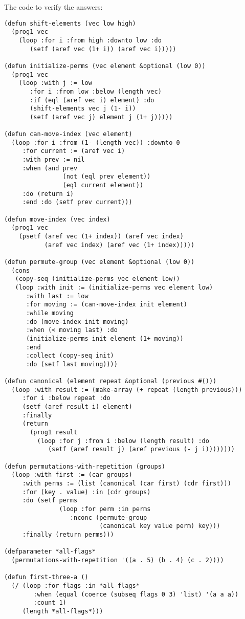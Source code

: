 \documentclass[11pt]{article}
\begin{document}
The code to verify the answers:
\lstset{language=Lisp,numbers=none}
\begin{lstlisting}
(defun shift-elements (vec low high)
  (prog1 vec
    (loop :for i :from high :downto low :do
       (setf (aref vec (1+ i)) (aref vec i)))))

(defun initialize-perms (vec element &optional (low 0))
  (prog1 vec
    (loop :with j := low
       :for i :from low :below (length vec)
       :if (eql (aref vec i) element) :do
       (shift-elements vec j (1- i))
       (setf (aref vec j) element j (1+ j)))))

(defun can-move-index (vec element)
  (loop :for i :from (1- (length vec)) :downto 0
     :for current := (aref vec i)
     :with prev := nil
     :when (and prev
                (not (eql prev element))
                (eql current element))
     :do (return i)
     :end :do (setf prev current)))

(defun move-index (vec index)
  (prog1 vec
    (psetf (aref vec (1+ index)) (aref vec index)
           (aref vec index) (aref vec (1+ index)))))

(defun permute-group (vec element &optional (low 0))
  (cons
   (copy-seq (initialize-perms vec element low))
   (loop :with init := (initialize-perms vec element low)
      :with last := low
      :for moving := (can-move-index init element)
      :while moving
      :do (move-index init moving)
      :when (< moving last) :do
      (initialize-perms init element (1+ moving))
      :end
      :collect (copy-seq init)
      :do (setf last moving))))

(defun canonical (element repeat &optional (previous #()))
  (loop :with result := (make-array (+ repeat (length previous)))
     :for i :below repeat :do
     (setf (aref result i) element)
     :finally 
     (return
       (prog1 result
         (loop :for j :from i :below (length result) :do
            (setf (aref result j) (aref previous (- j i))))))))

(defun permutations-with-repetition (groups)
  (loop :with first := (car groups)
     :with perms := (list (canonical (car first) (cdr first)))
     :for (key . value) :in (cdr groups)
     :do (setf perms
               (loop :for perm :in perms
                  :nconc (permute-group
                          (canonical key value perm) key)))
     :finally (return perms)))

(defparameter *all-flags*
  (permutations-with-repetition '((a . 5) (b . 4) (c . 2))))

(defun first-three-a ()
  (/ (loop :for flags :in *all-flags*
        :when (equal (coerce (subseq flags 0 3) 'list) '(a a a))
        :count 1)
     (length *all-flags*)))


\end{lstlisting}
\end{document}

